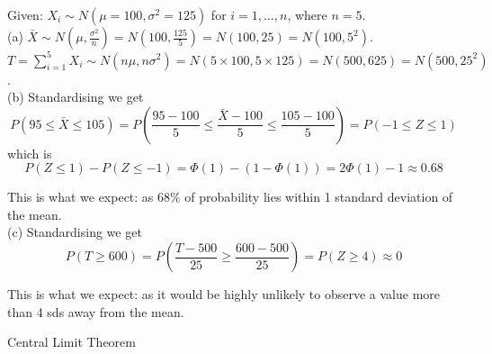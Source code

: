 \documentclass[bigtut]{tutorial}\usepackage[]{graphicx}\usepackage[]{color}
\begin{document}
\begin{tutorial}
\begin{questions}


\begin{solution}
Given: $X_{i} \sim N(\mu = 100, \sigma^2= 125)$ for $i=1,\ldots,n$, where $n=5$. \\

(a) 
$\bar{X} \sim N(\mu, \frac{\sigma^2}{n} ) = N(100, \frac{125}{5} )  = N(100,25) = N(100, 5^2)$. \\

$T = \sum_{i=1}^{5} X_{i} \sim N( n \mu, n \sigma^2) = N(5 \times 100, 5 \times 125) = N(500, 625) = N(500, 25^2)$. \\

(b)
Standardising we get
\[  P(95 \leq \bar{X} \leq 105) = P(\frac{95-100}{5} \leq \frac{\bar{X} - 100}{5} \leq \frac{105-100}{5}) = P(-1 \leq Z \leq 1) \]
which is
\[  P(Z \leq 1) - P(Z \leq -1) = \Phi(1) - (1-\Phi(1)) = 2 \Phi(1) - 1 \approx 0.68  \]

This is what we expect: as 68\% of probability lies within 1 standard deviation of the mean. \\
 
(c)
Standardising we get
 \[ P(T \geq 600) = P( \frac{T - 500}{25} \geq \frac {600-500}{25})  = P( Z \geq 4) \approx 0 \]

This is what we expect: as it would be highly unlikely to observe a value more than 4 sds away from the mean.

\end{solution}








\question Central Limit Theorem \\

\end{questions}
\end{tutorial}
\end{document}
